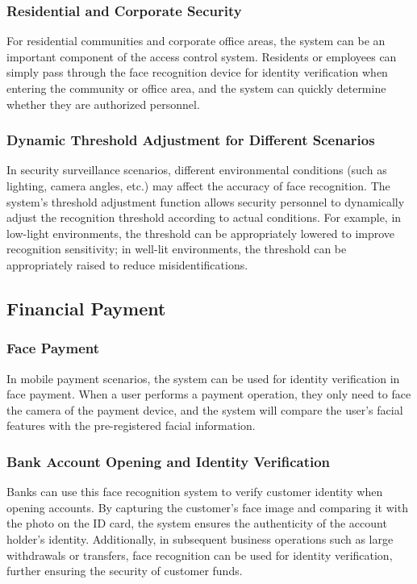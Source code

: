 \documentclass{article}
\begin{document}
\subsubsection{Residential and Corporate Security}
For residential communities and corporate office areas, the system can be an important component of the access control system. Residents or employees can simply pass through the face recognition device for identity verification when entering the community or office area, and the system can quickly determine whether they are authorized personnel.

\subsubsection{Dynamic Threshold Adjustment for Different Scenarios}
In security surveillance scenarios, different environmental conditions (such as lighting, camera angles, etc.) may affect the accuracy of face recognition. The system's threshold adjustment function allows security personnel to dynamically adjust the recognition threshold according to actual conditions. For example, in low-light environments, the threshold can be appropriately lowered to improve recognition sensitivity; in well-lit environments, the threshold can be appropriately raised to reduce misidentifications.

\subsection{Financial Payment}

\subsubsection{Face Payment}
In mobile payment scenarios, the system can be used for identity verification in face payment. When a user performs a payment operation, they only need to face the camera of the payment device, and the system will compare the user's facial features with the pre-registered facial information.

\subsubsection{Bank Account Opening and Identity Verification}
Banks can use this face recognition system to verify customer identity when opening accounts. By capturing the customer's face image and comparing it with the photo on the ID card, the system ensures the authenticity of the account holder's identity. Additionally, in subsequent business operations such as large withdrawals or transfers, face recognition can be used for identity verification, further ensuring the security of customer funds.
\end{document}
